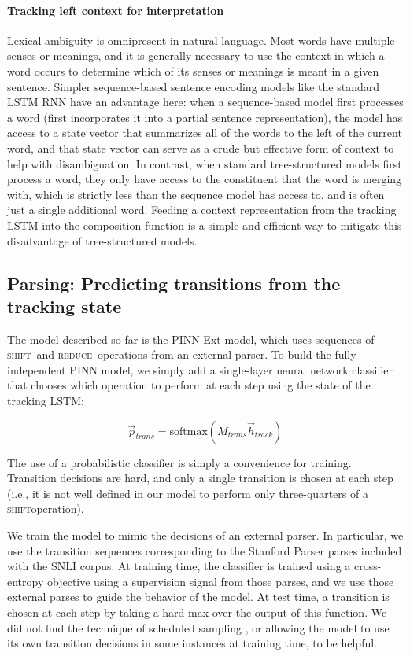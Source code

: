 \documentclass[11pt,letterpaper]{article}
\newcommand{\shift}{\textsc{shift}}
\newcommand{\reduce}{\textsc{reduce}}
\begin{document}
\paragraph{Tracking left context for interpretation} Lexical ambiguity is omnipresent in natural language. Most words have multiple senses or meanings, and it is generally necessary to use the context in which a word occurs to determine which of its senses or meanings is meant in a given sentence. Simpler sequence-based sentence encoding models like the standard LSTM RNN have an advantage here: when a sequence-based model first processes a word (first incorporates it into a partial sentence representation), the model has access to a state vector that summarizes all of the words to the left of the current word, and that state vector can serve as a crude but effective form of context to help with disambiguation. In contrast, when standard tree-structured models first process a word, they only have access to the constituent that the word is merging with, which is strictly less than the sequence model has access to, and is often just a single additional word. Feeding a context representation from the tracking LSTM into the composition function is a simple and efficient way to mitigate this disadvantage of tree-structured models.

\subsection{Parsing: Predicting transitions from the tracking state}

The model described so far is the PINN-Ext model, which uses sequences of \shift~and \reduce~operations from an external parser. To build the fully independent PINN model, we simply add a single-layer neural network classifier that chooses which operation to perform at each step using the state of the tracking LSTM:

\begin{equation}
\vec{p}_{trans} = \text{softmax}(M_{trans}\vec{h}_{track})
\end{equation}

The use of a probabilistic classifier is simply a convenience for training. Transition decisions are hard, and only a single transition is chosen at each step (i.e., it is not well defined in our model to perform only three-quarters of a \shift operation). 

We train the model to mimic the decisions of an external parser. In particular, we use the transition sequences corresponding to the Stanford Parser parses included with the SNLI corpus. At training time, the classifier is trained using a cross-entropy objective using a supervision signal from those parses, and we use those external parses to guide the behavior of the model. At test time, a transition is chosen at each step by taking a hard max over the output of this function. We did not find the technique of scheduled sampling \cite{bengio2015scheduled}, or allowing the model to use its own transition decisions in some instances at training time, to be helpful.
\end{document}
